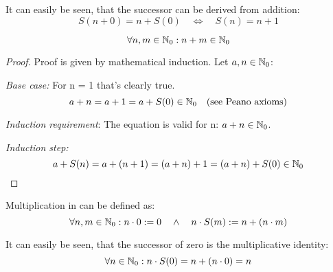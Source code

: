 \begin{corollary}
    It can easily be seen, that the successor can be derived from addition:
    \begin{equation}
        S(n+0) = n + S(0)  \quad \Leftrightarrow \quad S(n) = n + 1
    \end{equation}
\end{corollary}

\begin{theorem}
    \begin{equation}
        \forall n,m \in \mathbb{N}_0: n + m \in \mathbb{N}_0
    \end{equation}
\end{theorem}
\begin{proof}
    Proof is given by mathematical induction.
    Let $a,n \in \mathbb{N}_0$:

    \emph{Base case:} For n = 1 that's clearly true.
    \begin{equation}
        a + n = a + 1 = a + S(0) \in \mathbb{N}_0 \quad \text{(see Peano axioms)}
    \end{equation}

    \emph{Induction requirement}: The equation is valid for n: $a + n \in \mathbb{N}_0$.
    
    \emph{Induction step:} 
    \begin{equation}
        a + S(n) = a + (n + 1) = (a + n) + 1 = (a + n) + S(0) \in \mathbb{N}_0
    \end{equation}
\end{proof}

\begin{definition}
    Multiplication in \Nzero{} can be defined as:
    \begin{equation}
        \forall n,m \in \mathbb{N}_0: n \cdot 0:=0 \quad \land \quad n \cdot S(m) := n + (n \cdot m)
    \end{equation}
\end{definition}

\begin{corollary}
    It can easily be seen, that the successor of zero is the multiplicative identity:
    \begin{equation}
        \forall n \in \mathbb{N}_0: n \cdot S(0) = n + (n \cdot 0) = n
    \end{equation}
\end{corollary}

